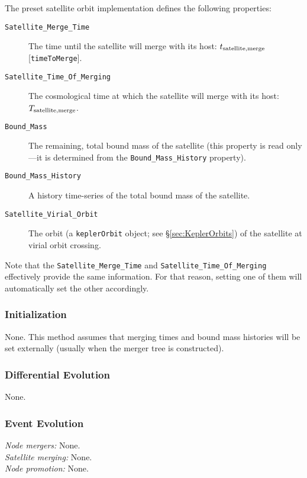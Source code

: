 The preset satellite orbit implementation defines the following properties:
\begin{description}
 \item [{\tt Satellite\_Merge\_Time}] The time until the satellite will merge with its host: $t_{\rm satellite, merge}$ [{\tt timeToMerge}].
 \item [{\tt Satellite\_Time\_Of\_Merging}] The cosmological time at which the satellite will merge with its host: $T_{\rm satellite, merge}$.
 \item [{\tt Bound\_Mass}] The remaining, total bound mass of the satellite (this property is read only---it is determined from the {\tt Bound\_Mass\_History} property).
 \item [{\tt Bound\_Mass\_History}] A history time-series of the total bound mass of the satellite.
 \item [{\tt Satellite\_Virial\_Orbit}] The orbit (a {\tt keplerOrbit} object; see \S\ref{sec:KeplerOrbits}) of the satellite at virial orbit crossing.
\end{description}

Note that the {\tt Satellite\_Merge\_Time} and {\tt Satellite\_Time\_Of\_Merging} effectively provide the same information. For that reason, setting one of them will automatically set the other accordingly.

\subsubsection{Initialization}

None. This method assumes that merging times and bound mass histories will be set externally (usually when the merger tree is constructed).

\subsubsection{Differential Evolution}

None.

\subsubsection{Event Evolution}

\noindent\emph{Node mergers:} None.\\

\noindent\emph{Satellite merging:} None.\\

\noindent\emph{Node promotion:} None.\\

